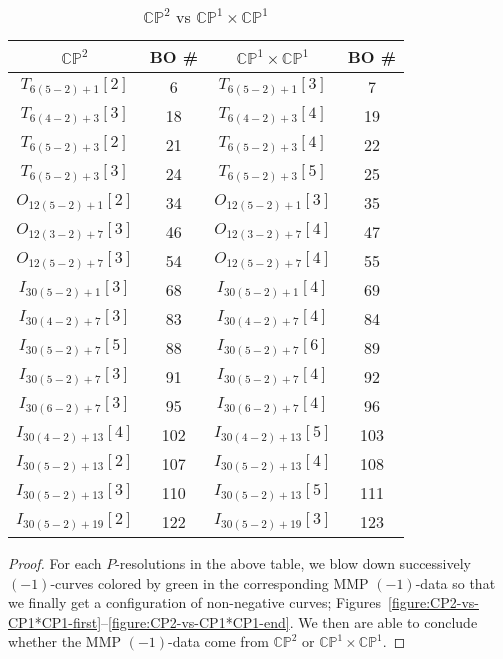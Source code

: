 \documentclass[reqno, twoside, a4paper]{amsart}
\theoremstyle{definition}
\numberwithin{equation}{section}
\begin{document}
\begin{table}
\centering
\begin{tabular}{c c c c}
\toprule
$\mathbb{CP}^2$ & BO \# & $\mathbb{CP}^1 \times \mathbb{CP}^1$ & BO \# \\
\midrule
$T_{6(5-2)+1}[2]$ & 6 & $T_{6(5-2)+1}[3]$ & 7 \\
\midrule
$T_{6(4-2)+3}[3]$ & 18 & $T_{6(4-2)+3}[4]$ & 19 \\
\midrule
$T_{6(5-2)+3}[2]$ & 21 & $T_{6(5-2)+3}[4]$ & 22 \\
\midrule
$T_{6(5-2)+3}[3]$ & 24 & $T_{6(5-2)+3}[5]$ & 25 \\
\midrule
$O_{12(5-2)+1}[2]$ & 34 & $O_{12(5-2)+1}[3]$ & 35  \\
\midrule
$O_{12(3-2)+7}[3]$ & 46 & $O_{12(3-2)+7}[4]$ & 47 \\
\midrule
$O_{12(5-2)+7}[3]$ & 54 & $O_{12(5-2)+7}[4]$ & 55 \\
\midrule
$I_{30(5-2)+1}[3]$ & 68 & $I_{30(5-2)+1}[4]$ & 69 \\
\midrule
$I_{30(4-2)+7}[3]$ & 83 & $I_{30(4-2)+7}[4]$ & 84 \\
\midrule
$I_{30(5-2)+7}[5]$ & 88 & $I_{30(5-2)+7}[6]$ & 89 \\
\midrule
$I_{30(5-2)+7}[3]$ & 91 & $I_{30(5-2)+7}[4]$ & 92\\
\midrule
$I_{30(6-2)+7}[3]$ & 95 & $I_{30(6-2)+7}[4]$ & 96 \\
\midrule
$I_{30(4-2)+13}[4]$ & 102 & $I_{30(4-2)+13}[5]$ & 103 \\
\midrule
$I_{30(5-2)+13}[2]$ & 107 & $I_{30(5-2)+13}[4]$ & 108 \\
\midrule
$I_{30(5-2)+13}[3]$ & 110 & $I_{30(5-2)+13}[5]$ & 111 \\
\midrule
$I_{30(5-2)+19}[2]$ & 122 & $I_{30(5-2)+19}[3]$ & 123 \\
\bottomrule
\end{tabular}

\medskip

\caption{$\mathbb{CP}^2$ vs $\mathbb{CP}^1 \times \mathbb{CP}^1$}
\label{table:CP2-vs-CP1*CP1}
\end{table}

\begin{proof}
For each $P$-resolutions in the above table, we blow down successively $(-1)$-curves colored by green in the corresponding MMP $(-1)$-data so that we finally get a configuration of non-negative curves; Figures~\ref{figure:CP2-vs-CP1*CP1-first}--\ref{figure:CP2-vs-CP1*CP1-end}. We then are able to conclude whether the MMP $(-1)$-data come from $\mathbb{CP}^2$ or $\mathbb{CP}^1 \times \mathbb{CP}^1$.
\end{proof}
\end{document}
